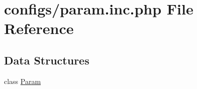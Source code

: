 \hypertarget{param_8inc_8php}{}\section{configs/param.inc.\+php File Reference}
\label{param_8inc_8php}
\subsection*{Data Structures}
\begin{DoxyCompactItemize}
\item 
class \hyperlink{class_param}{Param}
\end{DoxyCompactItemize}
